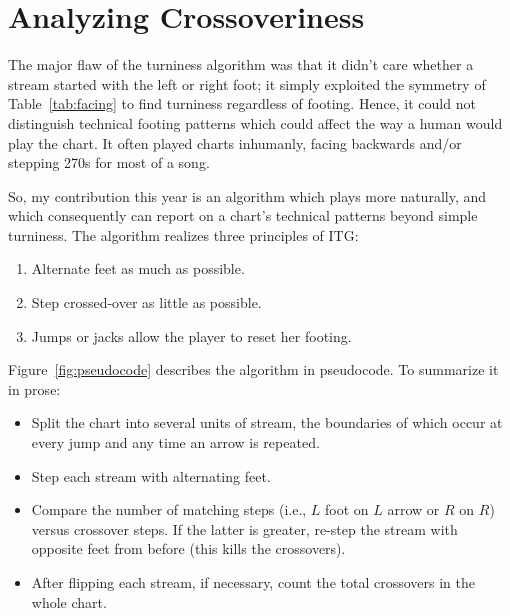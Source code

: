 \documentclass[10pt]{sigplanconf}
\begin{document}


\section{Analyzing Crossoveriness}

The major flaw of the turniness algorithm \cite{turniness}
was that it didn't care whether a stream started with the left or right foot;
it simply exploited the symmetry of Table~\ref{tab:facing} to find turniness regardless of footing.
Hence, it could not distinguish technical footing patterns which could affect the way a human would play the chart.
It often played charts inhumanly, facing backwards and/or stepping 270s for most of a song.

So, my contribution this year is an algorithm which plays more naturally,
and which consequently can report on a chart's technical patterns beyond simple turniness.
The algorithm realizes three principles of ITG:
\begin{enumerate}
	\item Alternate feet as much as possible.
	\item Step crossed-over as little as possible.
	\item Jumps or jacks allow the player to reset her footing.
\end{enumerate}

Figure~\ref{fig:pseudocode} describes the algorithm in pseudocode.
To summarize it in prose:
\begin{itemize}
	\item Split the chart into several units of stream,
		the boundaries of which occur at every jump and any time an arrow is repeated.
	\item Step each stream with alternating feet.
	\item Compare the number of matching steps (i.e., $L$ foot on $L$ arrow or $R$ on $R$) versus crossover steps.
		If the latter is greater, re-step the stream with opposite feet from before (this kills the crossovers).
	\item After flipping each stream, if necessary, count the total crossovers in the whole chart.
\end{itemize}

\newcommand\hilight[2]{\color{#1}#2\color{black}}
\end{document}
